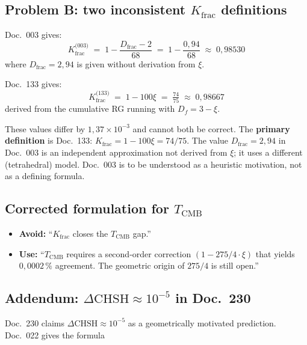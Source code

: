 \subsection*{Problem B: two inconsistent $K_\text{frac}$ definitions}

Doc.~003 gives:
\begin{equation}
  K_\text{frac}^\text{(003)} \;=\; 1 - \frac{D_\text{frac} - 2}{68}
  \;=\; 1 - \frac{0{,}94}{68} \;\approx\; 0{,}98530
  \tag{190.18}
\end{equation}
where $D_\text{frac} = 2{,}94$ is given without derivation from $\xi$.

Doc.~133 gives:
\begin{equation}
  K_\text{frac}^\text{(133)} \;=\; 1 - 100\xi \;=\; \tfrac{74}{75}
  \;\approx\; 0{,}98667
  \tag{190.19}
\end{equation}
derived from the cumulative RG running with $D_f = 3 - \xi$.

These values differ by $1{,}37 \times 10^{-3}$ and cannot both be correct. The
\textbf{primary definition} is Doc.~133: $K_\text{frac} = 1 - 100\xi = 74/75$.
The value $D_\text{frac} = 2{,}94$ in Doc.~003 is an independent approximation
not derived from $\xi$; it uses a different (tetrahedral) model. Doc.~003 is to
be understood as a heuristic motivation, not as a defining formula.

\subsection*{Corrected formulation for $T_\text{CMB}$}

\begin{itemize}
  \item \textbf{Avoid:} \enquote{$K_\text{frac}$ closes the $T_\text{CMB}$
        gap.}
  \item \textbf{Use:} \enquote{$T_\text{CMB}$ requires a second-order
        correction $(1 - 275/4\cdot\xi)$ that yields $0{,}0002\,\%$ agreement.
        The geometric origin of $275/4$ is still open.}
\end{itemize}

\subsection*{Addendum: $\Delta\text{CHSH} \approx 10^{-5}$ in Doc.~230}

Doc.~230 claims $\Delta\text{CHSH} \approx 10^{-5}$ as a geometrically
motivated prediction. Doc.~022 gives the formula

